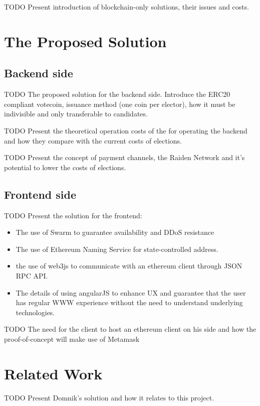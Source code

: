 \documentclass[twoside]{article}
\begin{document}
TODO Present introduction of blockchain-only solutions, their issues and costs.



\section{The Proposed Solution}

\subsection{Backend side}
TODO The proposed solution for the backend side. Introduce the ERC20 compliant votecoin, issuance method (one coin per elector), how it must be indivisible and only transferable to candidates.
 
TODO Present the theoretical operation costs of the for operating the backend and how they compare with the current costs of elections.

TODO Present the concept of payment channels, the Raiden Network and it's potential to lower the costs of elections.

\subsection{Frontend side}
TODO Present the solution for the frontend:
\begin{itemize}
\item{The use of Swarm to guarantee availability and DDoS resistance}
\item{The use of Ethereum Naming Service for state-controlled address.}
\item{the use of web3js to communicate with an ethereum client through JSON RPC API.}
\item{The details of using angularJS to enhance UX and guarantee that the user has regular WWW experience without the need to understand underlying technologies.}
\end{itemize}

TODO The need for the client to host an ethereum client on his side and how the proof-of-concept will make use of Metamask




\section{Related Work}
TODO Present Domnik's solution and how it relates to this project.
\end{document}
